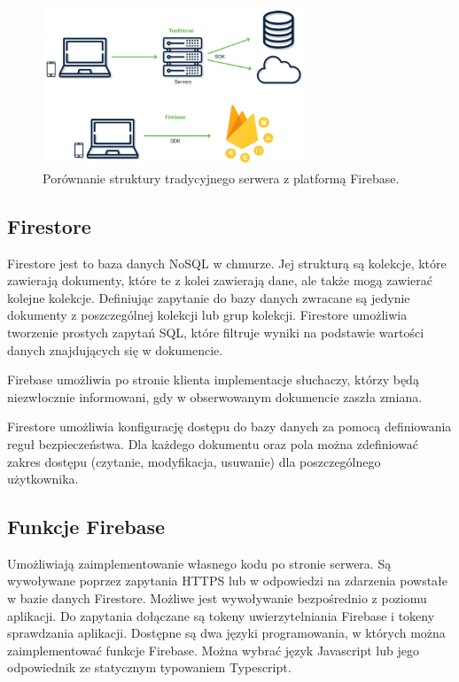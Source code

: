 \begin{figure}[h!]
	\begin{center}
		\includegraphics[width=0.7\textwidth]{img/firebase.png}
	\end{center}
	\caption{{\color{dgray} Porównanie struktury tradycyjnego serwera z platformą Firebase.}} 
	\label{struktura_firebase}
\end{figure}

\subsection{Firestore}

Firestore jest to baza danych NoSQL w chmurze. Jej strukturą są kolekcje, które zawierają dokumenty, które te z kolei zawierają dane, ale także mogą zawierać kolejne kolekcje. Definiując zapytanie do bazy danych zwracane są jedynie dokumenty z poszczególnej kolekcji lub grup kolekcji. Firestore umożliwia tworzenie prostych zapytań SQL, które filtruje wyniki na podstawie wartości danych znajdujących się w dokumencie. 

Firebase umożliwia po stronie klienta implementacje słuchaczy, którzy będą niezwłocznie informowani, gdy w obserwowanym dokumencie zaszła zmiana. 

Firestore umożliwia konfigurację dostępu do bazy danych za pomocą definiowania reguł bezpieczeństwa. Dla każdego dokumentu oraz pola można zdefiniować zakres dostępu (czytanie, modyfikacja, usuwanie) dla poszczególnego użytkownika.


\subsection{Funkcje Firebase}

Umożliwiają zaimplementowanie własnego kodu po stronie serwera. Są wywoływane poprzez zapytania HTTPS lub w odpowiedzi na zdarzenia powstałe w bazie danych Firestore. 
Możliwe jest wywoływanie bezpośrednio z poziomu aplikacji. Do zapytania dołączane są tokeny uwierzytelniania Firebase i tokeny sprawdzania aplikacji. Dostępne są dwa języki programowania, w których można zaimplementować funkcje Firebase. Można wybrać język Javascript lub jego odpowiednik ze statycznym typowaniem Typescript. \\

